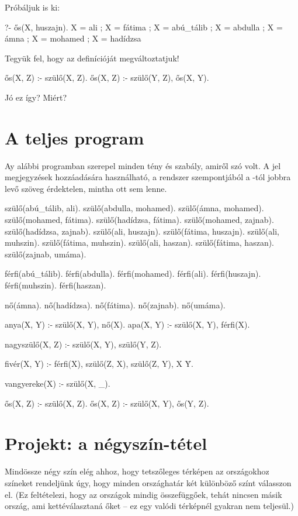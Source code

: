 Próbáljuk is ki:
\begin{query}
?- ős(X, huszajn).
X = ali ;
X = fátima ;
X = abú_tálib ;
X = abdulla ;
X = ámna ;
X = mohamed ;
X = hadídzsa
\end{query}

\begin{problem}
Tegyük fel, hogy az  definícióját
megváltoztatjuk!
\begin{program}
ős(X, Z) :- szülő(X, Z).
ős(X, Z) :- szülő(Y, Z), ős(X, Y).
\end{program}
Jó ez így? Miért?
\end{problem}

\section*{A teljes program}

Ay alábbi programban szerepel minden tény és
szabály, amiről szó volt. A \pr{\%} jel megjegyzések
hozzáadására használható, a rendszer szempontjából a
\pr{\%}-tól jobbra levő szöveg érdektelen, mintha
ott sem lenne.\index{\pr{\%}}

\begin{program}
szülő(abú_tálib, ali).
szülő(abdulla, mohamed).
szülő(ámna, mohamed).
szülő(mohamed, fátima).
szülő(hadídzsa, fátima).
szülő(mohamed, zajnab).
szülő(hadídzsa, zajnab).
szülő(ali, huszajn).
szülő(fátima, huszajn).
szülő(ali, muhszin).
szülő(fátima, muhszin).
szülő(ali, haszan).
szülő(fátima, haszan).
szülő(zajnab, umáma).

férfi(abú_tálib).
férfi(abdulla).
férfi(mohamed).
férfi(ali).
férfi(huszajn).
férfi(muhszin).
férfi(haszan).

nő(ámna).
nő(hadídzsa).
nő(fátima).
nő(zajnab).
nő(umáma).

anya(X, Y) :- szülő(X, Y), nő(X).   %
apa(X, Y) :- szülő(X, Y), férfi(X). %

nagyszülő(X, Z) :- szülő(X, Y), szülő(Y, Z).

fivér(X, Y) :-
    férfi(X),
    szülő(Z, X), szülő(Z, Y),
    X \= Y.

vangyereke(X) :- szülő(X, _).

ős(X, Z) :- szülő(X, Z).
ős(X, Z) :- szülő(X, Y), ős(Y, Z).
\end{program}

\clearpage

\section{Projekt: a négyszín-tétel}
Mindössze négy szín elég ahhoz, hogy tetszőleges
térképen az országokhoz színeket rendeljünk úgy,
hogy minden országhatár két különböző színt
válasszon el. (Ez feltételezi, hogy az országok
mindig összefüggőek, tehát nincsen másik ország, ami
kettéválasztaná őket -- ez egy valódi térképnél
gyakran nem teljesül.)

